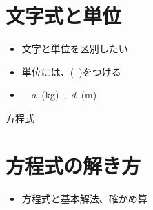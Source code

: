 ﻿\documentclass{jsarticle}
\begin{document}
\section{文字式と単位}
\begin{itemize}
\item 文字と単位を区別したい
\item 単位には、(\ )をつける
\item {} \ \ $a$\ (kg)\ ,\ $d$\ (m)
\end{itemize}


\newpage

{\LARGE \noindent 方程式}

\section{方程式の解き方}
\begin{itemize}
\item 方程式と基本解法、確かめ算
\end{itemize}
\end{document}
